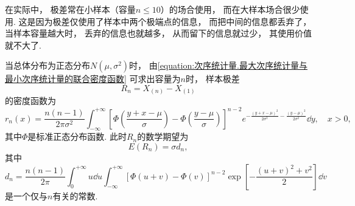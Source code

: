 在实际中，
极差常在小样本（容量\(n\leq10\)）的场合使用，
而在大样本场合很少使用.
这是因为极差仅使用了样本中两个极端点的信息，
而把中间的信息都丢弃了，
当样本容量越大时，
丢弃的信息也就越多，
从而留下的信息就过少，
其使用价值就不大了.

当总体分布为正态分布\(N(\mu,\sigma^2)\)时，
由\cref{equation:次序统计量.最大次序统计量与最小次序统计量的联合密度函数}
可求出容量为\(n\)时，
样本极差
\begin{equation}
	R_n
	= X_{(n)} - X_{(1)}
\end{equation}
的密度函数为
\begin{equation}
	r_n(x)
	= \frac{n(n-1)}{2\pi\sigma^2}
	\int_{-\infty}^{+\infty} \left[
		\Phi\left(
			\frac{y+x-\mu}{\sigma}
		\right)
		- \Phi\left(
			\frac{y-\mu}{\sigma}
		\right)
	\right]^{n-2}
	e^{
		-\frac{(y+x-\mu)^2}{2\sigma^2}
		-\frac{(y-\mu)^2}{2\sigma^2}
	}
	\dd{y},
	\quad x>0,
\end{equation}
其中\(\Phi\)是标准正态分布函数.
此时\(R_n\)的数学期望为
\begin{equation}
	E(R_n)
	= \sigma d_n,
\end{equation}
其中\[
	d_n
	= \frac{n(n-1)}{2\pi}
	\int_0^{+\infty} u \dd{u}
	\int_{-\infty}^{+\infty}
	[\Phi(u+v) - \Phi(v)]^{n-2}
	\exp[
		-\frac{(u+v)^2+v^2}{2}
	]
	\dd{v}
\]是一个仅与\(n\)有关的常数.
